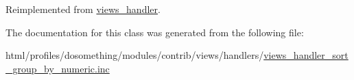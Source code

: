 Reimplemented from \hyperlink{classviews__handler_ae81019ed08d9c3f5bca3d16c69e7b39f}{views\_\-handler}.

The documentation for this class was generated from the following file:\begin{DoxyCompactItemize}
\item 
html/profiles/dosomething/modules/contrib/views/handlers/\hyperlink{views__handler__sort__group__by__numeric_8inc}{views\_\-handler\_\-sort\_\-group\_\-by\_\-numeric.inc}\end{DoxyCompactItemize}
